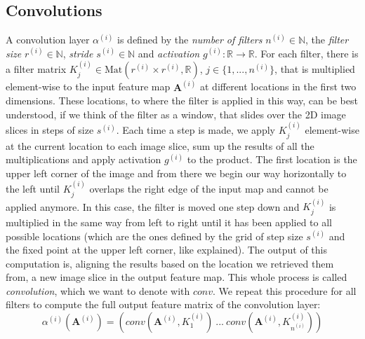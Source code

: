 \documentclass[12pt]{report}
\theoremstyle{definition}
\begin{document}
\subsection{Convolutions}
A convolution layer $\alpha^{(i)}$ is defined by the \emph{number of filters} $n^{(i)} \in \mathbb{N}$, the \emph{filter size} $r^{(i)}\in \mathbb{N}$, \emph{stride} $s^{(i)} \in \mathbb{N}$ and \emph{activation} $g^{(i)}: \mathbb{R} \rightarrow \mathbb{R}$. 
For each filter, there is a filter matrix $K^{(i)}_j \in \mathrm{Mat}(r^{(i)} \times r^{(i)}, \mathbb{R})$, $j \in \{ 1, ..., n^{(i)}\}$,  that is multiplied element-wise to the input feature map $\mathbf{A}^{(i)}$ at different locations in the first two dimensions. These locations, to where the filter is applied in this way, can be best understood, if we think of the filter as a window, that slides over the 2D image slices in steps of size $s^{(i)}$. Each time a step is made, we apply $K^{(i)}_j$ element-wise at the current location to each image slice, sum up the results of all the multiplications and apply activation $g^{(i)}$ to the product. 
The first location is the upper left corner of the image and from there we begin our way horizontally to the left until $K^{(i)}_j$ overlaps the right edge of the input map and cannot be applied anymore. In this case, the filter is moved one step down and $K^{(i)}_j$ is multiplied in the same way from left to right until it has been applied to all possible locations (which are the ones defined by the grid of step size $s^{(i)}$ and the fixed point at the upper left corner, like explained). 
The output of this computation is, aligning the results based on the location we retrieved them from, a new image slice in the output feature map. This whole process is called \emph{convolution}, which we want to denote with $conv$. We repeat this procedure for all filters to compute the full output feature matrix of the convolution layer:
\begin{equation}
\alpha^{(i)}(\mathbf{A}^{(i)}) = (conv(\mathbf{A}^{(i)}, K^{(i)}_1) \ ... \ conv(\mathbf{A}^{(i)}, K^{(i)}_{n^{(i)}})) 
\end{equation}
\end{document}
